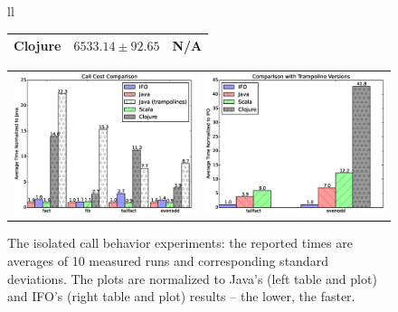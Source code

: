 \begin{figure}[h!t]
\begin{center}
\begin{tabular}{ll}
\begin{tabular}{|l|l|l|}
\textbf{Clojure}                                                                                           & $6533.14 \pm 92.65$ & N/A                       \\ \hline
\end{tabular}
\end{tabular}
  \begin{tabular}{ll}
  \begin{minipage}{8cm}{\includegraphics[width=8cm]{./src/img/low.eps}}\end{minipage} &
\begin{minipage}{8cm}{\includegraphics[width=8cm]{./src/img/high.eps}}\end{minipage}
\end{tabular}

\end{center}
\vspace{-20pt}
  \caption{The isolated call behavior experiments: the reported times are averages of 10 measured runs and corresponding standard deviations. The plots are normalized to Java's (left table and plot) and IFO's (right table and plot) results -- the lower, the faster.}

\label{fig:micro}
\end{figure}

